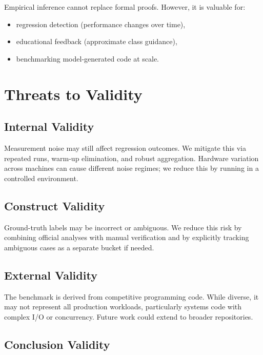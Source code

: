 \documentclass[conference]{IEEEtran}
\begin{document}
Empirical inference cannot replace formal proofs.
However, it is valuable for:
\begin{itemize}[leftmargin=1.2em]
\item regression detection (performance changes over time),
\item educational feedback (approximate class guidance),
\item benchmarking model-generated code at scale.
\end{itemize}

\section{Threats to Validity}
\label{sec:threats}

\subsection{Internal Validity}

Measurement noise may still affect regression outcomes.
We mitigate this via repeated runs, warm-up elimination, and robust aggregation.
Hardware variation across machines can cause different noise regimes; we reduce
this by running in a controlled environment.

\subsection{Construct Validity}

Ground-truth labels may be incorrect or ambiguous.
We reduce this risk by combining official analyses with manual verification and
by explicitly tracking ambiguous cases as a separate bucket if needed.

\subsection{External Validity}

The benchmark is derived from competitive programming code.
While diverse, it may not represent all production workloads, particularly
systems code with complex I/O or concurrency.
Future work could extend to broader repositories.

\subsection{Conclusion Validity}
\end{document}
